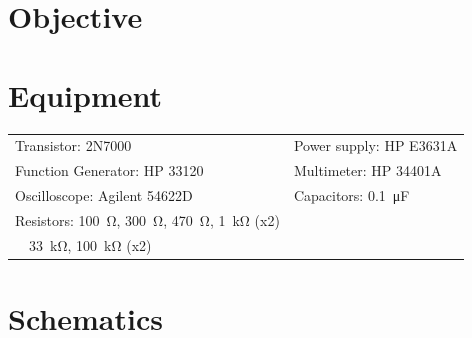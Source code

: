 

\section{Objective}
\label{sec:objective}


\section{Equipment}
\label{sec:equipment}

\begin{tabular}{ll}
  \centering
  Transistor: 2N7000               & Power supply: HP E3631A            \\
  Function Generator: HP 33120 & Multimeter: HP 34401A              \\
  Oscilloscope: Agilent 54622D & Capacitors: \SI{0.1}{\micro\farad} \\
  Resistors: \SI{100}{\ohm}, \SI{300}{\ohm}, \SI{470}{\ohm}, \SI{1}{\kilo\ohm} (x2) & \\
  ~~\SI{33}{\kilo\ohm}, \SI{100}{\kilo\ohm} (x2) & \\
\end{tabular}

\section{Schematics}
\label{sec:schematics}


